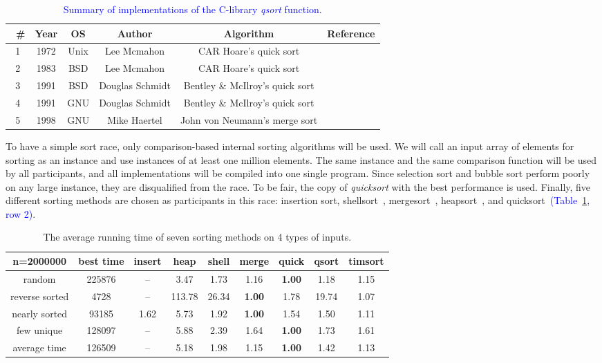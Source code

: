 \documentclass[AMA,STIX1COL]{WileyNJD-v2}
\newcommand{\qusort}{\emph{quicksort }}
\newcommand{\qsort}{\emph{qsort }}
\begin{document}
\begin{table}
\caption{\textcolor{blue}{Summary of implementations of the C-library \qsort function.}}
\centering
\begin{tabular}{|c|c|c|c|c|c|}
\toprule\
\# & Year & OS & Author & Algorithm & Reference\\
\midrule
1 & 1972 & Unix & Lee Mcmahon & CAR Hoare's quick sort  & \cite{hoare1961algorithm}\\
2 & 1983 & BSD & Lee Mcmahon & CAR Hoare's quick sort  & \cite{hoare1961algorithm}\\
3 & 1991 & BSD & Douglas Schmidt & Bentley \& McIlroy’s quick sort  & \cite{bentley1993engineering}\\
4 & 1991 & GNU & Douglas Schmidt & Bentley \& McIlroy’s quick sort  & \cite{bentley1993engineering}\\
5 & 1998 & GNU & Mike Haertel & John von Neumann's merge sort  & \cite{knuth1998sorting}\\
\bottomrule
\end{tabular}
\label{qsortalgo}
\end{table}
To have a simple sort race, only comparison-based internal sorting algorithms will be used. 
We will call an input array of elements for sorting as an instance and use instances of at least one million elements. 
The same instance and the same comparison function will be used by all participants, and all implementations will be compiled into one single program. 
Since selection sort and bubble sort perform poorly on any large instance, they are disqualified from the race. 
To be fair, the copy of \qusort with the best performance is used.
Finally, five different sorting methods are chosen as participants in this race: insertion sort, shellsort~\cite{knuth97}, mergesort~\cite{mcilroy1993optimistic}, heapsort~\cite{williams1964algorithm}, and quicksort~\cite{hoare1961algorithm}\textcolor{blue}{(Table~\ref{qsortalgo}, row 2)}.

\begin{table}
\caption{The average running time of seven sorting methods on 4 types of inputs.}
\centering
\begin{tabular}{|c|c|c|c|c|c|c|c|c|}
\toprule
n=2000000 & best time & insert & heap & shell & merge & quick & qsort & timsort\\
\midrule
random & 225876 & -- & 3.47 & 1.73 & 1.16 & \textbf{1.00} & 1.18 & 1.15 \\
reverse sorted&4728&--&113.78&26.34&\textbf{1.00}&1.78&19.74&1.07\\
nearly sorted & 93185&1.62&5.73&1.92&\textbf{1.00} & 1.54 &1.50 &1.11 \\
few unique & 128097 & --	& 5.88 & 2.39 & 1.64 & \textbf{1.00} & 1.73 & 1.61 \\
average time & 126509 & -- &	5.18& 1.98 & 1.15 & \textbf{1.00} & 1.42 & 1.13 \\
\bottomrule
\end{tabular}
\label{table1}
\end{table}
\end{document}
